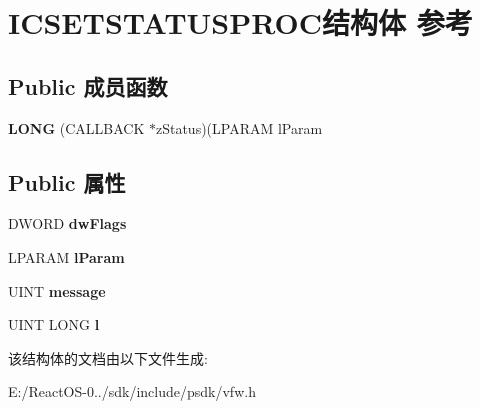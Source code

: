 \hypertarget{struct_i_c_s_e_t_s_t_a_t_u_s_p_r_o_c}{}\section{I\+C\+S\+E\+T\+S\+T\+A\+T\+U\+S\+P\+R\+O\+C结构体 参考}
\label{struct_i_c_s_e_t_s_t_a_t_u_s_p_r_o_c}
\subsection*{Public 成员函数}
\begin{DoxyCompactItemize}
\item 
\mbox{\label{struct_i_c_s_e_t_s_t_a_t_u_s_p_r_o_c_a07046359eccd0fa4bf13486ca1aae67d}} 
{\bfseries L\+O\+NG} (C\+A\+L\+L\+B\+A\+CK $\ast$z\+Status)(L\+P\+A\+R\+AM l\+Param
\end{DoxyCompactItemize}
\subsection*{Public 属性}
\begin{DoxyCompactItemize}
\item 
\mbox{\label{struct_i_c_s_e_t_s_t_a_t_u_s_p_r_o_c_a5ca4b89db1d24dfa902e638509818462}} 
D\+W\+O\+RD {\bfseries dw\+Flags}
\item 
\mbox{\label{struct_i_c_s_e_t_s_t_a_t_u_s_p_r_o_c_acc095ac3554b20b00d36b2ec5990aa2c}} 
L\+P\+A\+R\+AM {\bfseries l\+Param}
\item 
\mbox{\label{struct_i_c_s_e_t_s_t_a_t_u_s_p_r_o_c_a955aead03f0d00a3562864785c13009b}} 
U\+I\+NT {\bfseries message}
\item 
\mbox{\label{struct_i_c_s_e_t_s_t_a_t_u_s_p_r_o_c_a119aea9a0c61b678b6acecbc85706fe5}} 
U\+I\+NT L\+O\+NG {\bfseries l}
\end{DoxyCompactItemize}


该结构体的文档由以下文件生成\+:\begin{DoxyCompactItemize}
\item 
E\+:/\+React\+O\+S-\/0../sdk/include/psdk/vfw.\+h\end{DoxyCompactItemize}
